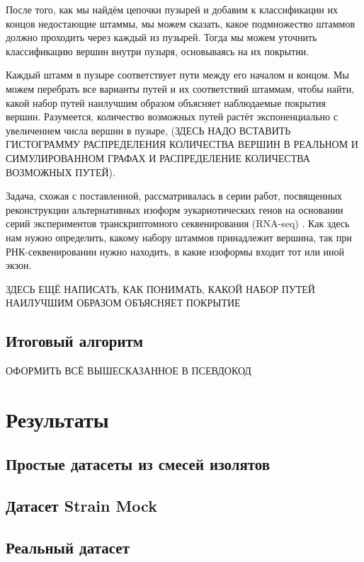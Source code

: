 \documentclass{spbau-diploma}
\begin{document}
После того, как мы найдём цепочки пузырей и добавим к классификации их концов недостающие штаммы, мы можем сказать, какое подмножество штаммов должно проходить через каждый из пузырей. Тогда мы можем уточнить классификацию вершин внутри пузыря, основываясь на их покрытии.

Каждый штамм в пузыре соответствует пути между его началом и концом. Мы можем перебрать все варианты путей и их соответствий штаммам, чтобы найти, какой набор путей наилучшим образом объясняет наблюдаемые покрытия вершин. Разумеется, количество возможных путей растёт экспоненциально с увеличением числа вершин в пузыре, (ЗДЕСЬ НАДО ВСТАВИТЬ ГИСТОГРАММУ РАСПРЕДЕЛЕНИЯ КОЛИЧЕСТВА ВЕРШИН В РЕАЛЬНОМ И СИМУЛИРОВАННОМ ГРАФАХ И РАСПРЕДЕЛЕНИЕ КОЛИЧЕСТВА ВОЗМОЖНЫХ ПУТЕЙ).

Задача, схожая с поставленной, рассматривалась в серии работ, посвященных реконструкции альтернативных изоформ эукариотических генов на основании серий экспериментов транскриптомного секвенирования (RNA-seq) \cite{flipflop2, other_flows, flipflop1}. Как здесь нам нужно определить, какому набору штаммов принадлежит вершина, так при РНК-секвенировании нужно находить, в какие изоформы входит тот или иной экзон.


ЗДЕСЬ ЕЩЁ НАПИСАТЬ, КАК ПОНИМАТЬ, КАКОЙ НАБОР ПУТЕЙ НАИЛУЧШИМ ОБРАЗОМ ОБЪЯСНЯЕТ ПОКРЫТИЕ

\subsection{Итоговый алгоритм}

ОФОРМИТЬ ВСЁ ВЫШЕСКАЗАННОЕ В ПСЕВДОКОД



\section{Результаты}
\subsection{Простые датасеты из смесей изолятов}
\subsection{Датасет Strain Mock}
\subsection{Реальный датасет} \label{infant_gut_section}
\end{document}
